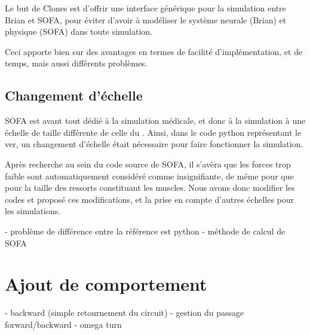 Le but de Clones est d'offrir une interface générique pour
la simulation entre Brian et SOFA, pour éviter d'avoir à modéliser
le système neurale (Brian) et physique (SOFA) dans toute simulation.

Ceci apporte bien sur des avantages en termes de facilité d'implémentation,
et de temps, mais aussi différents problèmes.

\subsection{Changement d'échelle} %
\label{sbu:Changement d'échelle}

SOFA est avant tout dédié à la simulation médicale, et donc à la simulation
à une échelle de taille différente de celle du \celeg{}. Ainsi, dans le code
python représentant le ver, un changement d'échelle était nécessaire pour
faire fonctionner la simulation.

Après recherche au sein du code source de SOFA, il s'avèra que les forces trop
faible sont automatiquement considéré comme insignifiante, de même pour que pour la taille
des ressorts constituant les muscles. Nous avons donc modifier les codes et proposé
ces modifications, et la prise en compte d'autres échelles pour les simulations.




- problème de différence entre la référence est python
- méthode de calcul de SOFA


\section{Ajout de comportement} %
\label{sec:Ajout de comportement}

- backward (simple retournement du circuit)
  - gestion du passage forward/backward
- omega turn


